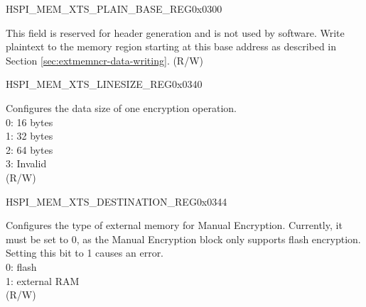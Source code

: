 
\begin{register}{H}{SPI\_MEM\_XTS\_PLAIN\_BASE\_REG}{0x0300}\label{regdesc:SPIMEMXTSPLAINBASEREG}
%
\regnewline%
\begin{regdesc}\begin{reglist}
\label{fielddesc:SPIMEMXTSPLAIN}\item [SPI\_MEM\_XTS\_PLAIN] This field is reserved for header generation and is not used by software. Write plaintext to the memory region starting at this base address as described in Section \ref{sec:extmemncr-data-writing}. (R/W)
\end{reglist}\end{regdesc}
\end{register}


\begin{register}{H}{SPI\_MEM\_XTS\_LINESIZE\_REG}{0x0340}\label{regdesc:SPIMEMXTSLINESIZEREG}
%
%
\regnewline%
\begin{regdesc}\begin{reglist}
\label{fielddesc:SPIMEMXTSLINESIZE}\item [SPI\_MEM\_XTS\_LINESIZE] Configures the data size of one encryption operation. \\
0: 16 bytes\\
1: 32 bytes\\
2: 64 bytes\\
3: Invalid\\
(R/W)
\end{reglist}\end{regdesc}
\end{register}


\begin{register}{H}{SPI\_MEM\_XTS\_DESTINATION\_REG}{0x0344}\label{regdesc:SPIMEMXTSDESTINATIONREG}
%
%
\regnewline%
\begin{regdesc}\begin{reglist}
\label{fielddesc:SPIMEMXTSDESTINATION}\item [SPI\_MEM\_XTS\_DESTINATION] Configures the type of external memory for Manual Encryption. Currently, it must be set to 0, as the Manual Encryption block only supports flash encryption. Setting this bit to 1 causes an error.\\
0: flash\\
1: external RAM\\
(R/W)
\end{reglist}\end{regdesc}
\end{register}


